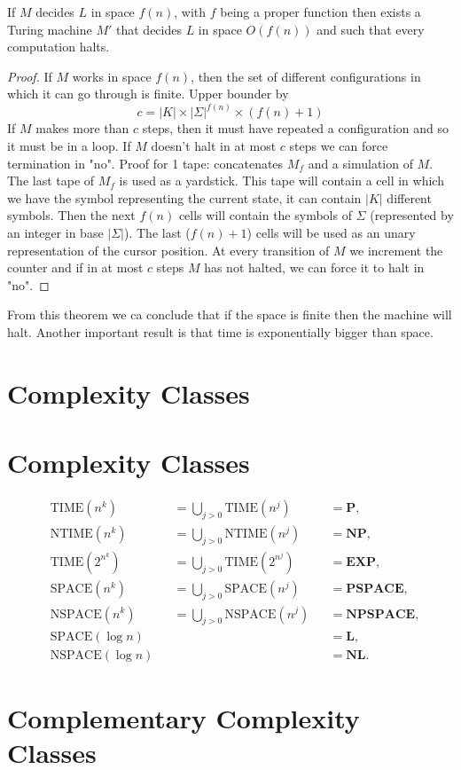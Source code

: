 \documentclass[12pt]{article}
\begin{document}
\begin{defbox}
If $M$ decides $L$ in space $f(n)$, with $f$ being a proper function then exists a Turing machine $M'$ that decides $L$ in space $O(f(n))$ and such that every computation halts.
\end{defbox}
\begin{proof}
  If $M$ works in space $f(n)$, then the set of different configurations in which it can go through is finite. 
  Upper bounder by 
  $$c=|K|\times|\Sigma|^{f(n)}\times (f(n)+1)$$
  If $M$ makes more than $c$ steps, then it must have repeated a configuration and so it must be in a loop. If $M$ doesn't halt in at most $c$ steps we can force termination in "no".
  Proof for 1 tape: concatenates $M_f$ and a simulation of $M$. The last tape of $M_f$ is used as a yardstick. This tape will contain a cell in which we have the symbol representing the current state, it can contain $|K|$ different symbols. Then the next $f(n)$ cells will contain the symbols of $\Sigma$ (represented by an integer in base $|\Sigma|$). The last ($f(n)+1$) cells will be used as an unary representation of the cursor position.
  At every transition of $M$ we increment the counter and if in at most $c$ steps $M$ has not halted, we can force it to halt in "no".
\end{proof}

From this theorem we ca conclude that if the space is finite then the machine will halt. Another important result is that time is exponentially bigger than space. 

\section{Complexity Classes}
\section{Complexity Classes}
\[
\begin{aligned}
    &\text{TIME}(n^k) && = \bigcup_{j > 0} \text{TIME}(n^j)  &&= \textbf{P}, \\
    &\text{NTIME}(n^k) && = \bigcup_{j > 0} \text{NTIME}(n^j)  &&= \textbf{NP}, \\
    &\text{TIME}(2^{n^k}) && = \bigcup_{j > 0} \text{TIME}(2^{n^j})  &&= \textbf{EXP}, \\
    &\text{SPACE}(n^k) && = \bigcup_{j > 0} \text{SPACE}(n^j)  &&= \textbf{PSPACE}, \\
    &\text{NSPACE}(n^k) && = \bigcup_{j > 0} \text{NSPACE}(n^j) && = \textbf{NPSPACE}, \\
    &\text{SPACE}(\log n) &&&& = \textbf{L}, \\
    &\text{NSPACE}(\log n) &&&& = \textbf{NL}.
\end{aligned}
\]
\section{Complementary Complexity Classes}
\end{document}

